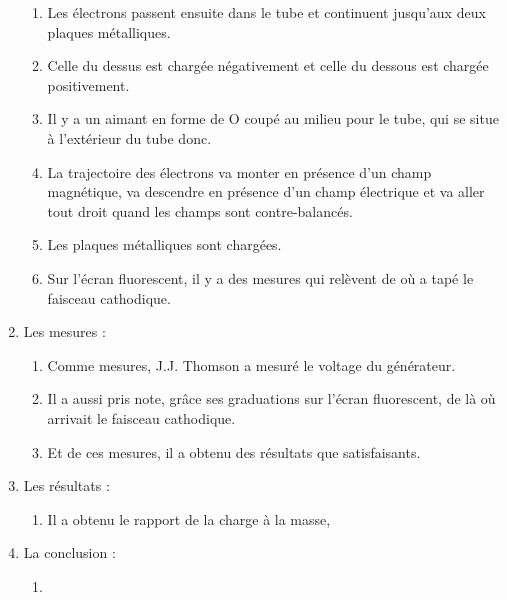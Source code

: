 \documentclass[../main.tex]{subfiles}
\begin{document}
\begin{enumerate}
\begin{enumerate}
    \item Les électrons passent ensuite dans le tube et continuent jusqu'aux deux plaques métalliques.
    \item Celle du dessus est chargée négativement et celle du dessous est chargée positivement.
    \item Il y a un aimant en forme de O coupé au milieu pour le tube, qui se situe à l'extérieur du tube donc.
    \item La trajectoire des électrons va monter en présence d'un champ magnétique, va descendre en présence d'un champ électrique et  va aller tout droit quand les champs sont contre-balancés. 
    \item Les plaques métalliques sont chargées.
    \item Sur l'écran fluorescent, il y a des mesures qui relèvent de où a tapé le faisceau cathodique. 
    \end{enumerate}
    \item Les mesures :
    \begin{enumerate}
        \item Comme mesures, J.J. Thomson a mesuré le voltage du générateur.
        \item Il a aussi pris note, grâce ses graduations sur l'écran fluorescent, de là où arrivait le faisceau cathodique.
        \item Et de ces mesures, il a obtenu des résultats que satisfaisants.
    \end{enumerate}
    \item Les résultats :
    \begin{enumerate}
        \item Il a obtenu le rapport de la charge à la masse, 
    \end{enumerate}
    \item La conclusion :
    \begin{enumerate}
        \item 
    \end{enumerate}
\end{enumerate}



\end{document}
